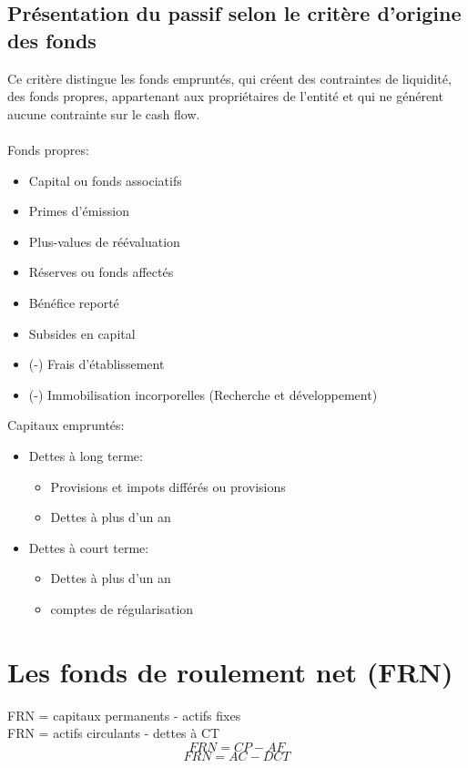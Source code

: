 \documentclass{article}
\begin{document}
 \subsection{Présentation du passif selon le critère d'origine des fonds}
 Ce critère distingue les fonds empruntés, qui créent des contraintes de liquidité, des fonds propres, appartenant aux propriétaires de l'entité et qui ne générent aucune contrainte sur le cash flow. \\ \\ 
 Fonds propres:
 \begin{itemize}
     \item Capital ou fonds associatifs
     \item Primes d'émission
     \item Plus-values de réévaluation
     \item Réserves ou fonds affectés
     \item Bénéfice reporté
     \item Subsides en capital
     \item (-) Frais d'établissement
     \item (-) Immobilisation incorporelles (Recherche et développement)
 \end{itemize}
 Capitaux empruntés:
 \begin{itemize}
    \item Dettes à long terme:
     \begin{itemize}
         \item Provisions et impots différés ou provisions
         \item Dettes à plus d'un an
     \end{itemize}
     \item Dettes à court terme:
     \begin{itemize}
         \item Dettes à plus d'un an
         \item comptes de régularisation
     \end{itemize}
 \end{itemize}
 
 \section{Les fonds de roulement net (FRN)}
 FRN = capitaux permanents - actifs fixes\\
 FRN = actifs circulants - dettes à CT \\
 
 $$FRN = CP - AF$$
 $$FRN = AC - DCT$$
 
\end{document}
